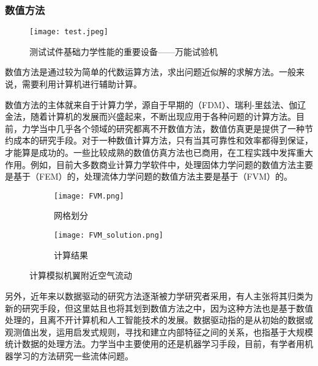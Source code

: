 \subsubsection{数值方法}

\begin{wrapfigure}{l}{5cm}
    \texttt{[image: test.jpeg]}
    \caption{测试试件基础力学性能的重要设备——万能试验机}
\end{wrapfigure}

数值方法是通过较为简单的代数运算方法，求出问题近似解的求解方法。一般来说，需要利用计算机进行辅助计算。

数值方法的主体就来自于计算力学，源自于早期的（FDM）、瑞利-里兹法、伽辽金法，随着计算机的发展而兴盛起来，不断出现应用于各种问题的计算方法。目前，力学当中几乎各个领域的研究都离不开数值方法，数值仿真更是提供了一种节约成本的研究手段。对于一种数值计算方法，只有当其可靠性和效率都得到保证，才能算是成功的。一些比较成熟的数值仿真方法也已商用，在工程实践中发挥重大作用。例如，目前大多数商业计算力学软件中，处理固体力学问题的数值方法主要是基于（FEM）的，处理流体力学问题的数值方法主要是基于（FVM）的。

\begin{figure}[ht]
    \centering
    \begin{subfigure}[t]{0.4\textwidth} \centering
        \texttt{[image: FVM.png]}
        \caption{网格划分}
    \end{subfigure}\quad
    \begin{subfigure}[t]{0.4\textwidth} \centering
        \texttt{[image: FVM\_solution.png]}
        \caption{计算结果}
    \end{subfigure}
    \caption{计算模拟机翼附近空气流动}
\end{figure}

另外，近年来以数据驱动的研究方法逐渐被力学研究者采用，有人主张将其归类为新的研究手段，但这里姑且也将其划到数值方法之中，因为这种方法也是基于数值处理的，且离不开计算机和人工智能技术的发展。数据驱动指的是从初始的数据或观测值出发，运用启发式规则，寻找和建立内部特征之间的关系，也指基于大规模统计数据的处理方法。力学当中主要使用的还是机器学习手段，目前，有学者用机器学习的方法研究一些流体问题。